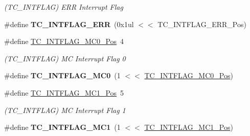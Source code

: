 \begin{DoxyCompactItemize}
\begin{DoxyCompactList}\small\item\em (T\+C\+\_\+\+I\+N\+T\+F\+L\+A\+G) E\+R\+R Interrupt Flag \end{DoxyCompactList}\item 
\hypertarget{group___s_a_m_l21___t_c_ga00c7ee884665fb362e9d2741667ec9f9}{}\#define {\bfseries T\+C\+\_\+\+I\+N\+T\+F\+L\+A\+G\+\_\+\+E\+R\+R}~(0x1ul $<$$<$ T\+C\+\_\+\+I\+N\+T\+F\+L\+A\+G\+\_\+\+E\+R\+R\+\_\+\+Pos)\label{group___s_a_m_l21___t_c_ga00c7ee884665fb362e9d2741667ec9f9}

\item 
\hypertarget{group___s_a_m_l21___t_c_gaf1e92336aae706c045911074e8e70a1f}{}\#define \hyperlink{group___s_a_m_l21___t_c_gaf1e92336aae706c045911074e8e70a1f}{T\+C\+\_\+\+I\+N\+T\+F\+L\+A\+G\+\_\+\+M\+C0\+\_\+\+Pos}~4\label{group___s_a_m_l21___t_c_gaf1e92336aae706c045911074e8e70a1f}

\begin{DoxyCompactList}\small\item\em (T\+C\+\_\+\+I\+N\+T\+F\+L\+A\+G) M\+C Interrupt Flag 0 \end{DoxyCompactList}\item 
\hypertarget{group___s_a_m_l21___t_c_gaf2c5f2a6dcf1a87cbef2274f2a9bdb66}{}\#define {\bfseries T\+C\+\_\+\+I\+N\+T\+F\+L\+A\+G\+\_\+\+M\+C0}~(1 $<$$<$ \hyperlink{group___s_a_m_l21___t_c_gaf1e92336aae706c045911074e8e70a1f}{T\+C\+\_\+\+I\+N\+T\+F\+L\+A\+G\+\_\+\+M\+C0\+\_\+\+Pos})\label{group___s_a_m_l21___t_c_gaf2c5f2a6dcf1a87cbef2274f2a9bdb66}

\item 
\hypertarget{group___s_a_m_l21___t_c_ga9c6179be84cccbc9275e14b7cde48723}{}\#define \hyperlink{group___s_a_m_l21___t_c_ga9c6179be84cccbc9275e14b7cde48723}{T\+C\+\_\+\+I\+N\+T\+F\+L\+A\+G\+\_\+\+M\+C1\+\_\+\+Pos}~5\label{group___s_a_m_l21___t_c_ga9c6179be84cccbc9275e14b7cde48723}

\begin{DoxyCompactList}\small\item\em (T\+C\+\_\+\+I\+N\+T\+F\+L\+A\+G) M\+C Interrupt Flag 1 \end{DoxyCompactList}\item 
\hypertarget{group___s_a_m_l21___t_c_gaf230e9f5c63cbf389543b9a4379ef9fc}{}\#define {\bfseries T\+C\+\_\+\+I\+N\+T\+F\+L\+A\+G\+\_\+\+M\+C1}~(1 $<$$<$ \hyperlink{group___s_a_m_l21___t_c_ga9c6179be84cccbc9275e14b7cde48723}{T\+C\+\_\+\+I\+N\+T\+F\+L\+A\+G\+\_\+\+M\+C1\+\_\+\+Pos})\label{group___s_a_m_l21___t_c_gaf230e9f5c63cbf389543b9a4379ef9fc}


\end{DoxyCompactItemize}
